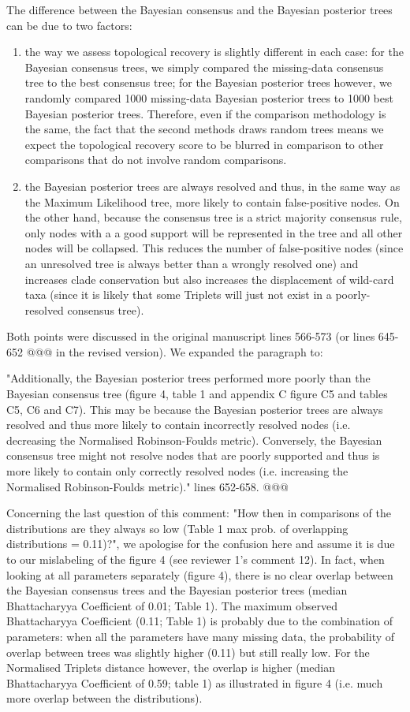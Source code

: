 \documentclass[12pt,letterpaper]{article}
\begin{document}
\begin{enumerate}
The difference between the Bayesian consensus and the Bayesian posterior trees can be due to two factors:
\begin{enumerate}[I]
\item the way we assess topological recovery is slightly different in each case: for the Bayesian consensus trees, we simply compared the missing-data consensus tree to the best consensus tree; for the Bayesian posterior trees however, we randomly compared 1000 missing-data Bayesian posterior trees to 1000 best Bayesian posterior trees.
Therefore, even if the comparison methodology is the same, the fact that the second methods draws random trees means we expect the topological recovery score to be blurred in comparison to other comparisons that do not involve random comparisons.
\item the Bayesian posterior trees are always resolved and thus, in the same way as the Maximum Likelihood tree, more likely to contain false-positive nodes. On the other hand, because the consensus tree is a strict majority consensus rule, only nodes with a a good support will be represented in the tree and all other nodes will be collapsed. This reduces the number of false-positive nodes (since an unresolved tree is always better than a wrongly resolved one) and increases clade conservation but also increases the displacement of wild-card taxa (since it is likely that some Triplets will just not exist in a poorly-resolved consensus tree).
\end{enumerate}
Both points were discussed in the original manuscript lines 566-573 (or lines 645-652 @@@ in the revised version).
We expanded the paragraph to:

"Additionally, the Bayesian posterior trees performed more poorly than the Bayesian consensus tree (figure 4, table 1 and appendix C figure C5 and tables C5, C6 and C7).
This may be because the Bayesian posterior trees are always resolved and thus more likely to contain incorrectly resolved nodes (i.e. decreasing the Normalised Robinson-Foulds metric).
Conversely, the Bayesian consensus tree might not resolve nodes that are poorly supported and thus is more likely to contain only correctly resolved nodes (i.e. increasing the Normalised Robinson-Foulds metric)." lines 652-658. @@@

Concerning the last question of this comment: "How then in comparisons of the distributions are they always so low (Table 1 max prob. of overlapping distributions = 0.11)?", we apologise for the confusion here and assume it is due to our mislabeling of the figure 4 (see reviewer 1's comment 12).
In fact, when looking at all parameters separately (figure 4), there is no clear overlap between the Bayesian consensus trees and the Bayesian posterior trees (median Bhattacharyya Coefficient of 0.01; Table 1).
The maximum observed Bhattacharyya Coefficient (0.11; Table 1) is probably due to the combination of parameters: when all the parameters have many missing data, the probability of overlap between trees was slightly higher (0.11) but still really low.
For the Normalised Triplets distance however, the overlap is higher (median Bhattacharyya Coefficient of 0.59; table 1) as illustrated in figure 4 (i.e. much more overlap between the distributions).



\end{enumerate}
\end{document}
